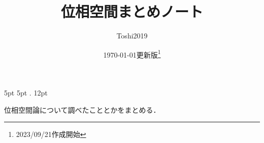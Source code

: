     {5pt}%
    {5pt}%
    {}%
    {}%
    {\bfseries}%
    {.}%
    {12pt}%
    {}%

\theoremstyle{mystyle}
\newtheorem{AXM}{公理}[section]
\newtheorem{DFN}[Axiom]{定義}
\newtheorem{THM}[Axiom]{定理}
\newtheorem*{THM*}{定理}
\newtheorem{PRP}[Axiom]{命題}
\newtheorem{LMM}[Axiom]{補題}
\newtheorem{CRL}[Axiom]{系}
\newtheorem{EG}[Axiom]{例}
\newtheorem{CNV}[Axiom]{規約}





\def\inner<#1>{\langle #1 \rangle}

\def\ind<#1>{\mathop{\text{``}\hspace{-0.7pt}#1\limits\hspace{-1.5pt}\text{''}}}







\title{位相空間まとめノート}
\author{Toshi2019}
\date{\today 更新版\footnote{2023/09/21作成開始}}

\maketitle

位相空間論について調べたこととかをまとめる．


